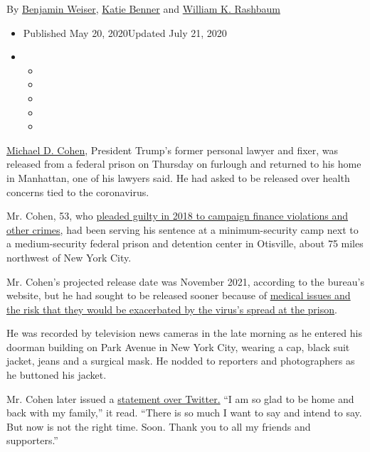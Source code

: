 By \href{https://www.nytimes.com/by/benjamin-weiser}{Benjamin Weiser},
\href{https://www.nytimes.com/by/katie-benner}{Katie Benner} and
\href{https://www.nytimes.com/by/william-k-rashbaum}{William K.
Rashbaum}

\begin{itemize}
\item
  Published May 20, 2020Updated July 21, 2020
\item
  \begin{itemize}
  \item
  \item
  \item
  \item
  \item
  \end{itemize}
\end{itemize}

\href{https://www.nytimes.com/2020/07/23/nyregion/michael-cohen-trump-book.html}{Michael
D. Cohen}, President Trump's former personal lawyer and fixer, was
released from a federal prison on Thursday on furlough and returned to
his home in Manhattan, one of his lawyers said. He had asked to be
released over health concerns tied to the coronavirus.

Mr. Cohen, 53, who
\href{https://slack-redir.net/link?url=https\%3A\%2F\%2Fwww.nytimes.com\%2F2018\%2F08\%2F21\%2Fnyregion\%2Fmichael-cohen-guilty-plea-trump-takeaways.html}{pleaded
guilty in 2018 to campaign finance violations and other crimes}, had
been serving his sentence at a minimum-security camp next to a
medium-security federal prison and detention center in Otisville, about
75 miles northwest of New York City.

Mr. Cohen's projected release date was November 2021, according to the
bureau's website, but he had sought to be released sooner because of
\href{https://slack-redir.net/link?url=https\%3A\%2F\%2Fwww.nytimes.com\%2F2020\%2F04\%2F17\%2Fnyregion\%2Fmichael-cohen-release-prison-otisville-virus.html}{medical
issues and the risk that they would be exacerbated by the virus's spread
at the prison}.

He was recorded by television news cameras in the late morning as he
entered his doorman building on Park Avenue in New York City, wearing a
cap, black suit jacket, jeans and a surgical mask. He nodded to
reporters and photographers as he buttoned his jacket.

Mr. Cohen later issued a
\href{https://twitter.com/MichaelCohen212/status/1263500906609496064}{statement
over Twitter.} ``I am so glad to be home and back with my family,'' it
read. ``There is so much I want to say and intend to say. But now is not
the right time. Soon. Thank you to all my friends and supporters.''

